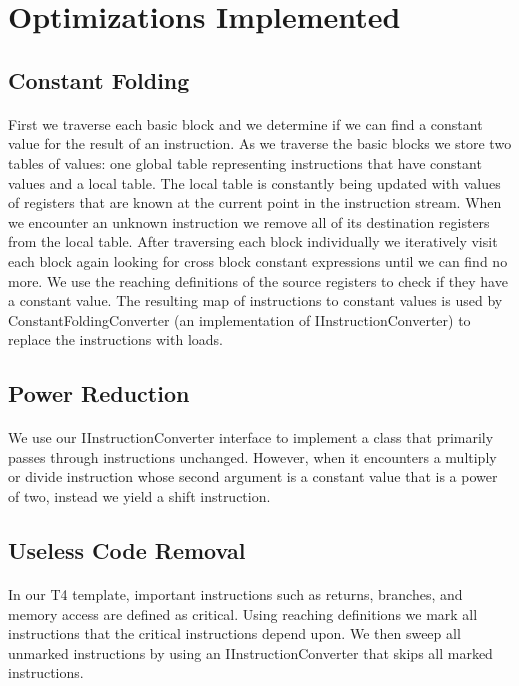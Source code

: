 \documentclass[12pt]{article}
\begin{document}
\section{Optimizations Implemented}

\subsection{Constant Folding}
\paragraph{}
First we traverse each basic block and we determine if we can find a constant value for the result of an instruction.
As we traverse the basic blocks we store two tables of values: one global table representing instructions that have constant values and a local table.
The local table is constantly being updated with values of registers that are known at the current point in the instruction stream.
When we encounter an unknown instruction we remove all of its destination registers from the local table.
After traversing each block individually we iteratively visit each block again looking for cross block constant expressions until we can find no more.
We use the reaching definitions of the source registers to check if they have a constant value.
The resulting map of instructions to constant values is used by ConstantFoldingConverter (an implementation of IInstructionConverter) to replace the instructions with loads.

\subsection{Power Reduction}
\paragraph{}
We use our IInstructionConverter interface to implement a class that primarily passes through instructions unchanged.
However, when it encounters a multiply or divide instruction whose second argument is a constant value that is a power of two, instead we yield a shift instruction.

\subsection{Useless Code Removal}
\paragraph{}
In our T4 template, important instructions such as returns, branches, and memory access are defined as critical.
Using reaching definitions we mark all instructions that the critical instructions depend upon.
We then sweep all unmarked instructions by using an IInstructionConverter that skips all marked instructions.
\end{document}
